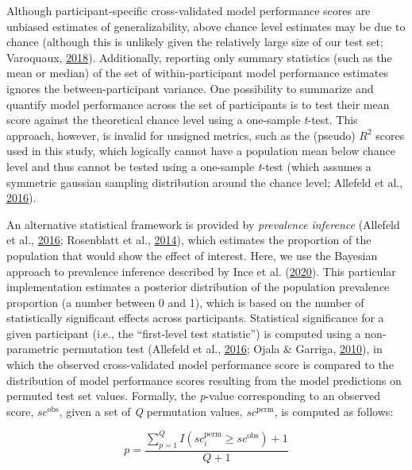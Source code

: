 \documentclass[11pt,american,a4paper,oneside,]{memoir} %
\begin{document}
Although participant-specific cross-validated model performance scores are unbiased estimates of generalizability, above chance level estimates may be due to chance (although this is unlikely given the relatively large size of our test set; Varoquaux, \protect\hyperlink{ref-Varoquaux2018-uo}{2018}). Additionally, reporting only summary statistics (such as the mean or median) of the set of within-participant model performance estimates ignores the between-participant variance. One possibility to summarize and quantify model performance across the set of participants is to test their mean score against the theoretical chance level using a one-sample \emph{t}-test. This approach, however, is invalid for unsigned metrics, such as the (pseudo) \(R^{2}\) scores used in this study, which logically cannot have a population mean below chance level and thus cannot be tested using a one-sample \emph{t}-test (which assumes a symmetric gaussian sampling distribution around the chance level; Allefeld et al., \protect\hyperlink{ref-Allefeld2016-xp}{2016}).

An alternative statistical framework is provided by \emph{prevalence inference} (Allefeld et al., \protect\hyperlink{ref-Allefeld2016-xp}{2016}; Rosenblatt et al., \protect\hyperlink{ref-Rosenblatt2014-az}{2014}), which estimates the proportion of the population that would show the effect of interest. Here, we use the Bayesian approach to prevalence inference described by Ince et al. (\protect\hyperlink{ref-Ince2020-mr}{2020}). This particular implementation estimates a posterior distribution of the population prevalence proportion (a number between 0 and 1), which is based on the number of statistically significant effects across participants. Statistical significance for a given participant (i.e., the ``first-level test statistic'') is computed using a non-parametric permutation test (Allefeld et al., \protect\hyperlink{ref-Allefeld2016-xp}{2016}; Ojala \& Garriga, \protect\hyperlink{ref-Ojala2010-rc}{2010}), in which the observed cross-validated model performance score is compared to the distribution of model performance scores resulting from the model predictions on permuted test set values. Formally, the \emph{p}-value corresponding to an observed score, \(sc^{\mathrm{obs}}\), given a set of \emph{Q} permutation values, \(sc^{\mathrm{perm}}\), is computed as follows:

\begin{equation}
p = \frac{\sum_{p=1}^{Q} I(sc_{i}^{\mathrm{perm}} \geq sc^{\mathrm{obs}}) + 1}{Q + 1}
\end{equation}
\end{document}
